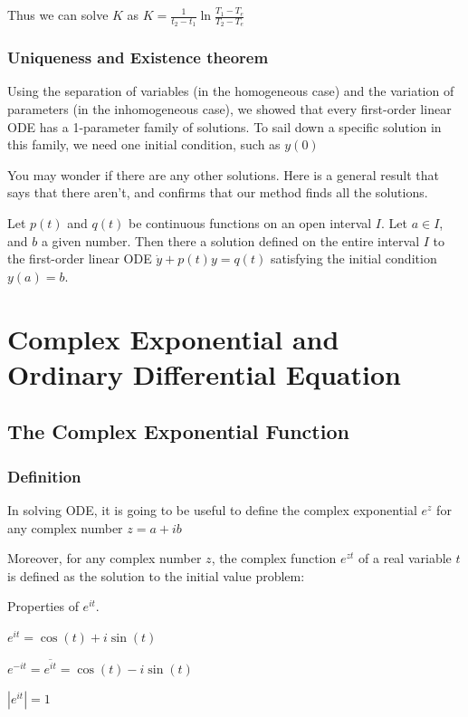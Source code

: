 \documentclass[11pt, openright]{book}
\begin{document}
Thus we can solve $K$ as $K=\frac{1}{t_2-t_1}\ln\frac{T_1-T_e}{T_2-T_e}$

\subsection{Uniqueness and Existence theorem}

Using the separation of variables (in the homogeneous case) and the variation of parameters (in the inhomogeneous case), we showed that every first-order linear ODE has a 1-parameter family of solutions. To sail down a specific solution in this family, we need one initial condition, such as $y(0)$

You may wonder if there are any other solutions. Here is a general result that says that there aren't, and confirms that our method finds all the solutions.

 Let $p(t)$ and $q(t)$ be continuous functions on an open interval $I$. Let $a\in I$, and $b$ a given number. Then there  a  solution defined on the entire interval $I$ to the first-order linear ODE $\dot{y}+p(t)y=q(t)$ satisfying the initial condition $y(a)=b$.

\chapter{Complex Exponential and Ordinary Differential Equation}

\section{The Complex Exponential Function}

\subsection{Definition}

In solving ODE, it is going to be useful to define the complex exponential $e^z$ for any complex number $z=a+ib$

Moreover, for any complex number $z$, the complex function $e^{zt}$ of a real variable $t$ is defined as the solution to the initial value problem:

\begin{dent}{Properties of $e^{it}$.}
    \begin{items}{-10pt}{-5pt}
        \item $e^{it}=\cos(t)+i\sin(t)$
        \item $e^{-it}=\overline{e^{it}}=\cos(t)-i\sin(t)$
        \item $|e^{it}|=1$
    \end{items}
\end{dent}
\end{document}
